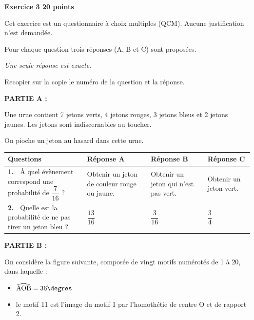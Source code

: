 \documentclass[11pt]{article}
\begin{document}
\bigskip

\textbf{Exercice 3 \hfill 20 points}

\medskip

Cet exercice est un questionnaire à choix multiples (QCM). Aucune justification n'est demandée.

Pour chaque question trois réponses (A, B et C) sont proposées.

\emph{Une seule réponse est exacte}. 

Recopier sur la copie le numéro de la question et la réponse.

\bigskip

\textbf{PARTIE A :}

\medskip

Une urne contient 7 jetons verts, 4 jetons rouges, 3 jetons bleus et 2 jetons jaunes. Les jetons sont indiscernables au toucher. 

On pioche un jeton au hasard dans cette urne.

\begin{center}
\begin{tabularx}{\linewidth}{|m{3.25cm}|*{3}{X|}}\hline
\textbf{Questions}&\textbf{Réponse A}&\textbf{Réponse B}&\textbf{Réponse C}\\ \hline
\textbf{1.~} À quel évènement correspond une probabilité de $\dfrac{7}{16}$ ?&Obtenir un jeton de couleur rouge ou jaune.&Obtenir un jeton qui n'est pas vert.&Obtenir un jeton vert.\\ \hline
\textbf{2.~} Quelle est la probabilité de ne pas tirer un jeton
bleu ?& \qquad \qquad$\dfrac{13}{16}$ &\qquad  \qquad$\dfrac{3}{16}$ &\qquad  \qquad$\dfrac{3}{4}$\\ \hline
\end{tabularx}
\end{center}

\bigskip

\textbf{PARTIE B :}

\medskip

On considère la figure suivante, composée de vingt motifs numérotés de 1 à 20, dans laquelle : 

\setlength\parindent{9mm}
\begin{itemize}
\item[$\bullet~~$] $\widehat{\text{AOB}} =  36\degres$
\item[$\bullet~~$] le motif 11 est l'image du motif 1 par l'homothétie de centre O et de rapport 2.
\end{itemize}
\setlength\parindent{0mm}
\end{document}
